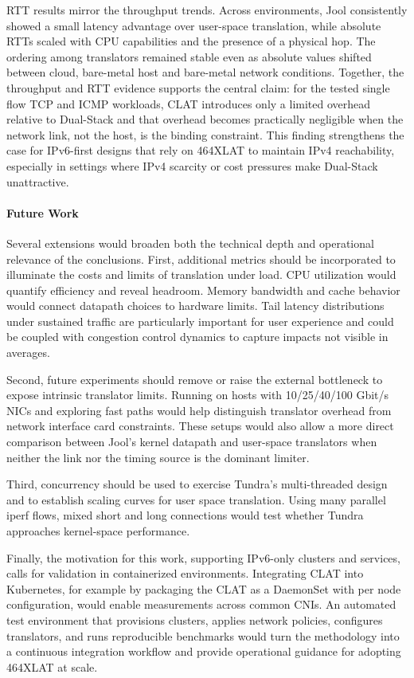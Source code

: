 RTT results mirror the throughput trends. Across environments, Jool consistently showed a small latency advantage over user-space translation, while absolute RTTs scaled with CPU capabilities and the presence of a physical hop. The ordering among translators remained stable even as absolute values shifted between cloud, bare-metal host and bare-metal network conditions. Together, the throughput and RTT evidence supports the central claim: for the tested single flow TCP and ICMP workloads, CLAT introduces only a limited overhead relative to Dual-Stack and that overhead becomes practically negligible when the network link, not the host, is the binding constraint. This finding strengthens the case for IPv6-first designs that rely on 464XLAT to maintain IPv4 reachability, especially in settings where IPv4 scarcity or cost pressures make Dual-Stack unattractive.

\paragraph{Future Work}

Several extensions would broaden both the technical depth and operational relevance of the conclusions. First, additional metrics should be incorporated to illuminate the costs and limits of translation under load. CPU utilization would quantify efficiency and reveal headroom. Memory bandwidth and cache behavior would connect datapath choices to hardware limits. Tail latency distributions under sustained traffic are particularly important for user experience and could be coupled with congestion control dynamics to capture impacts not visible in averages. 

Second, future experiments should remove or raise the external bottleneck to expose intrinsic translator limits. Running on hosts with 10/25/40/100 Gbit/s NICs and exploring fast paths would help distinguish translator overhead from network interface card constraints. These setups would also allow a more direct comparison between Jool’s kernel datapath and user-space translators when neither the link nor the timing source is the dominant limiter.

Third, concurrency should be used to exercise Tundra’s multi-threaded design and to establish scaling curves for user space translation. Using many parallel iperf flows, mixed short and long connections would test whether Tundra approaches kernel-space performance. 

Finally, the motivation for this work, supporting IPv6-only clusters and services, calls for validation in containerized environments. Integrating CLAT into Kubernetes, for example by packaging the CLAT as a DaemonSet with per node configuration, would enable measurements across common CNIs. An automated test environment that provisions clusters, applies network policies, configures translators, and runs reproducible benchmarks would turn the methodology into a continuous integration workflow and provide operational guidance for adopting 464XLAT at scale.
